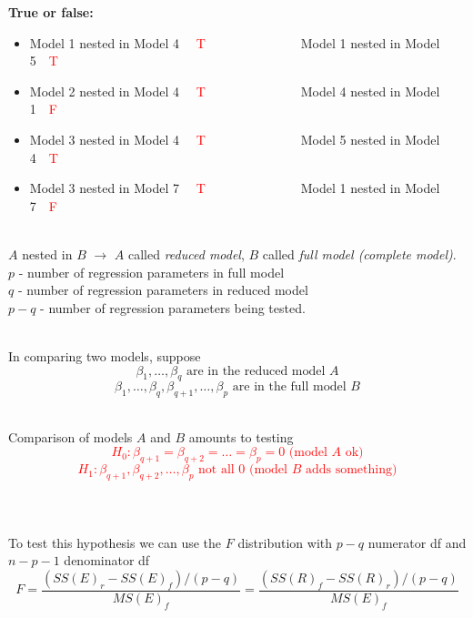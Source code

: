 \textbf{True or false:}
\begin{itemize}
\item Model 1 nested in Model 4 ~~\textcolor{red}{T}~~~~~~~~~~~~~~~Model 1 nested in Model 5~~\textcolor{red}{T}
\item Model 2 nested in Model 4 ~~\textcolor{red}{T}~~~~~~~~~~~~~~~Model 4 nested in Model 1~~\textcolor{red}{F}
\item Model 3 nested in Model 4 ~~\textcolor{red}{T}~~~~~~~~~~~~~~~Model 5 nested in Model 4~~\textcolor{red}{T}
\item Model 3 nested in Model 7 ~~\textcolor{red}{T}~~~~~~~~~~~~~~~Model 1 nested in Model 7~~\textcolor{red}{F}
\end{itemize}
~\\
$A$ nested in $B$ $\longrightarrow$ $A$ called {\em reduced model}, $B$ called {\em full model (complete model)}.  \\
$p$ - number of regression parameters in full model  \\
$q$ - number of regression parameters in reduced model \\
$p-q$ - number of regression parameters being tested. \\~\\

\newpage

In comparing two models, suppose
$$\beta_1,\ldots,\beta_q\mbox{ are in the reduced model } A$$
$$\beta_1,\ldots,\beta_q,\beta_{q+1},\ldots,\beta_p \mbox{ are in the full model } B$$

~\\Comparison of models $A$ and $B$ amounts to testing%
\textcolor{red}{$$H_0: \beta_{q+1} = \beta_{q+2} = \ldots = \beta_{p} =0 \text{ (model $A$ ok)}$$
$$H_1: \beta_{q+1} , \beta_{q+2} , \ldots , \beta_{p} \text{ not all 0 (model $B$ adds something)}$$}~\\~\\~\\

To test this hypothesis we can use the $F$ distribution with $p-q$ numerator df and $n-p-1$ denominator df
$$F = \frac{(SS(E)_r - SS(E)_f)/(p-q)}{MS(E)_f}=\frac{(SS(R)_f - SS(R)_r)/(p-q)}{MS(E)_f}$$

